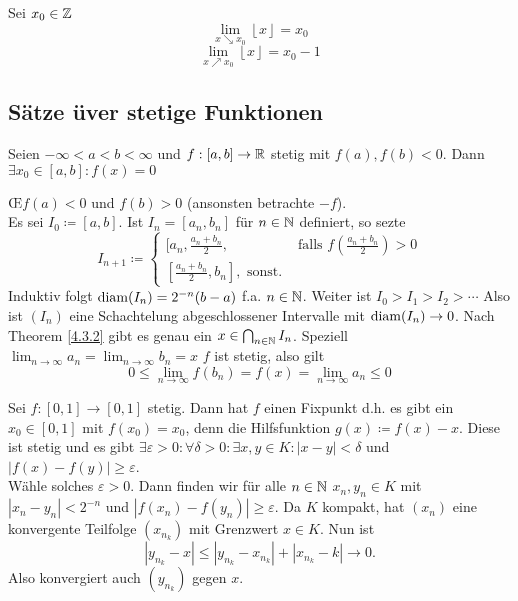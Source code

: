 \begin{subexample}
	Sei $ x_0 \in \mathbb{Z}  $ 
	\[
		\lim_{x \searrow x_0} \left\lfloor x \right\rfloor = x_0
	\]
	\[
		\lim_{x \nearrow x_0} \left\lfloor x \right\rfloor = x_0 -1
	\]
\end{subexample}

\subsection{Sätze üver stetige Funktionen}
\begin{subtheorem}
	Seien $ -\infty < a < b < \infty $ und $ f:[a, b] \to \mathbb{R}  $ stetig mit $ f(a), f(b) < 0 $.
	Dann $ \exists x_0 \in [a, b] : f(x) = 0 $
\end{subtheorem}

\begin{subproof*}
	\OE $ f(a) < 0 $ und $ f(b) > 0 $ (ansonsten betrachte $ -f $).\\
	Es sei $ I_0 \coloneqq [a, b] $.
	Ist $ I_n = [a_n, b_n] $ für $ n \in \mathbb{N}  $ definiert, so sezte
	\[
		I_{n+1} \coloneqq \begin{cases}
			[a_n, \frac{ a_n + b_n }{ 2 } , & \text{ falls } f\left(\frac{ a_n + b_n }{ 2 }\right)  > 0 \\
			[\frac{ a_n + b_n }{ 2 } , b_n], \text{ sonst.} 
		\end{cases}
	\]
	Induktiv folgt $ \operatorname{diam}(I_n) = 2^{-n}(b - a) $ f.a. $ n \in \mathbb{N}  $. Weiter ist $ I_0 > I_1 > I_2 > \dotsb $ Also ist $ (I_n) $ eine Schachtelung abgeschlossener Intervalle mit $ \operatorname{diam}(I_n) \to 0 $. Nach Theorem \ref{4.3.2} gibt es genau ein $ x \in \bigcap_{n \in \mathbb{N} } I_n $.
	Speziell $ \lim_{n \to \infty} a_n = \lim_{n \to \infty} b_n = x $ $ f  $ ist stetig, also gilt 
	\[
		0 \leq \lim_{n \to \infty} f(b_n) = f(x) = \lim_{n \to \infty} a_n \leq  0
	\]
	
\end{subproof*}

\begin{subexample}
	Sei $ f:[0,1] \to [0, 1] $ stetig. Dann hat $ f $ einen Fixpunkt d.h. es gibt ein $ x_0 \in [0,1] $ mit $ f(x_0) = x_0 $, denn die Hilfsfunktion $ g(x) \coloneqq f(x) - x $. Diese ist stetig und es gibt $ \exists \varepsilon > 0: \forall \delta > 0 : \exists x,y \in K: | x-y| < \delta  $ und $ |f(x) - f(y)| \geq \varepsilon  $.\\
	Wähle solches $ \varepsilon > 0 $. Dann finden wir für alle $ n \in \mathbb{N}  $ $ x_n, y_n \in K $ mit $ |x_n - y_n| < 2^{-n} $ und $ |f(x_n) - f(y_n)| \geq \varepsilon  $. Da $ K $ kompakt, hat $ (x_n) $ eine konvergente Teilfolge $ (x_{n_k}) $ mit Grenzwert $ x \in K $. Nun ist
	\[
		\left| y_{n_k} - x  \right| \leq \left| y_{n_k} - x_{n_k} \right| + \left| x_{n_k} - k \right| \to 0.
	\]
	Also konvergiert auch $ (y_{n_k}) $ gegen $ x $.
\end{subexample}

